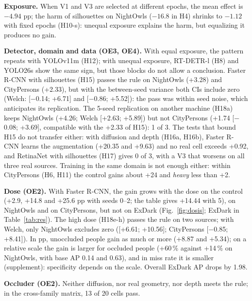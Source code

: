 \documentclass[conference]{IEEEtran}
\begin{document}
\textbf{Exposure.} When V1 and V3 are selected at different epochs, the mean effect is $-4.94$ pp; the harm of silhouettes on NightOwls ($-16.8$ in H4) shrinks to $-1.12$ with fixed epochs (H10-s): unequal exposure explains the harm, but equalizing it produces no gain.

\textbf{Detector, domain and data (OE3, OE4).} With equal exposure, the pattern repeats with YOLOv11m (H12); with unequal exposure, RT-DETR-l (H8) and YOLO26s show the same sign, but those blocks do not allow a conclusion. Faster R-CNN with silhouettes (H15) passes the rule on NightOwls (+3.28) and CityPersons (+2.33), but with the between-seed variance both CIs include zero (Welch: [$-$0.14; +6.71] and [$-$0.86; +5.52]): the pass was within seed noise, which anticipates its replication. The 5-seed replication on another machine (H18a) keeps NightOwls (+4.26; Welch [+2.63; +5.89]) but not CityPersons (+1.74 [$-$0.08; +3.69], compatible with the +2.33 of H15): 1 of 3. The tests that bound H15 do not transfer either: with diffusion and depth (H16a, H16b), Faster R-CNN learns the augmentation (+20.35 and +9.63) and no real cell exceeds +0.92, and RetinaNet with silhouettes (H17) gives 0 of 3, with a V3 that worsens on all three real sources. Training in the same domain is not enough either: within CityPersons (H6, H11) the control gains about +24 and \emph{heavy} less than +2.

\textbf{Dose (OE2).} With Faster R-CNN, the gain grows with the dose on the control (+2.9, +14.8 and +25.6 pp with seeds 0--2; the table gives +14.44 with 5), on NightOwls and on CityPersons, but not on ExDark (Fig.~\ref{fig:dosis}; ExDark in Table~\ref{tab:res}). The high dose (H18e-h) passes the rule on two sources; with Welch, only NightOwls excludes zero ([+6.61; +10.56]; CityPersons [$-$0.85; +8.41]). In pp, unoccluded people gain as much or more (+8.87 and +5.34); on a relative scale the gain is larger for occluded people (+60\,\% against +14\,\% on NightOwls, with base AP 0.14 and 0.63), and in miss rate it is smaller (supplement): specificity depends on the scale. Overall ExDark AP drops by 1.98.

\textbf{Occluder (OE2).} Neither diffusion, nor real geometry, nor depth meets the rule; in the cross-family matrix, 13 of 20 cells pass.
\end{document}
